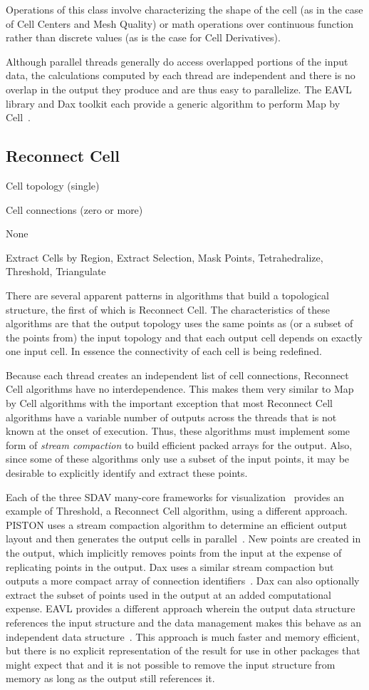 \documentclass{sig-alternate}
\newcommand*{\lcite}[1]{~\cite{#1}}
\newcommand*{\keyterm}[1]{\emph{#1}}
\newcommand{\algclass}[1]{\textsf{#1}}
\newcommand{\alg}[1]{#1}
\newcommand{\algorithmclasssection}[1]{\subsection*{#1}}
\newcommand{\algorithmclass}[5]{
  \algorithmclasssection{#1} %
  \begin{description}[leftmargin=9em,style=nextline,noitemsep]
    \raggedright
  \item[Input] #2
  \item[Output] #3
  \item[Interdependence] #4
  \item[Algorithms] #5
  \end{description}
}
\begin{document}
Operations of this class involve characterizing the shape of the cell (as
in the case of \alg{Cell Centers} and \alg{Mesh Quality}) or math
operations over continuous function rather than discrete values (as is the
case for \alg{Cell Derivatives}).

Although parallel threads generally do access overlapped portions of the
input data, the calculations computed by each thread are independent and
there is no overlap in the output they produce and are thus easy to
parallelize. The EAVL library and Dax toolkit each provide a generic
algorithm to perform \algclass{Map by Cell}\lcite{EAVL,Moreland2011:LDAV}.


\algorithmclass{Reconnect Cell}
               {Cell topology (single)} %
               {Cell connections (zero or more)} %
               {None} %
               {Extract Cells by Region, Extract Selection, Mask Points,
                 Tetrahedralize, Threshold, Triangulate}

\noindent
There are several apparent patterns in algorithms that build a topological
structure, the first of which is \algclass{Reconnect Cell}. The
characteristics of these algorithms are that the output topology uses the
same points as (or a subset of the points from) the input topology and that
each output cell depends on exactly one input cell. In essence the
connectivity of each cell is being redefined.

Because each thread creates an independent list of cell connections,
\algclass{Reconnect Cell} algorithms have no interdependence. This makes
them very similar to \algclass{Map by Cell} algorithms with the important
exception that most \algclass{Reconnect Cell} algorithms have a variable
number of outputs across the threads that is not known at the onset of
execution. Thus, these algorithms must implement some form of
\keyterm{stream compaction} to build efficient packed arrays for the
output. Also, since some of these algorithms only use a subset of the input
points, it may be desirable to explicitly identify and extract these
points.

Each of the three SDAV many-core frameworks for
visualization\lcite{Sewell2012} provides an example of \alg{Threshold}, a
\algclass{Reconnect Cell} algorithm, using a different approach. PISTON
uses a stream compaction algorithm to determine an efficient output layout
and then generates the output cells in parallel\lcite{PISTON}. New points
are created in the output, which implicitly removes points from the input
at the expense of replicating points in the output. Dax uses a similar
stream compaction but outputs a more compact array of connection
identifiers\lcite{Maynard2013}. Dax can also optionally extract the subset
of points used in the output at an added computational expense. EAVL
provides a different approach wherein the output data structure references
the input structure and the data management makes this behave as an
independent data structure\lcite{Meredith2012}. This approach is much
faster and memory efficient, but there is no explicit representation of the
result for use in other packages that might expect that and it is not
possible to remove the input structure from memory as long as the output
still references it.
\end{document}
